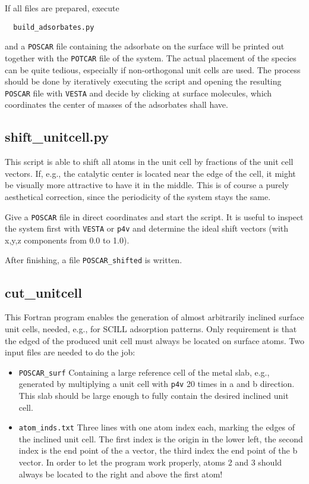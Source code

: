 \documentclass[a4paper,11pt]{article}
\begin{document}
 If all files are prepared, execute

 \begin{verbatim}
  build_adsorbates.py
 \end{verbatim}

 and a \texttt{POSCAR} file containing the adsorbate on the surface will be printed out
 together with the \texttt{POTCAR} file of the system.
 The actual placement of the species can be quite tedious, especially if non-orthogonal
 unit cells are used. The process should be done by iteratively executing the script
 and opening the resulting \texttt{POSCAR} file with \texttt{VESTA} and decide by clicking
 at surface molecules, which coordinates the center of masses of the adsorbates shall have.




\subsection{shift\_unitcell.py}\label{shift_unitcell}

This script is able to shift all atoms in the unit cell by fractions of the 
unit cell vectors. If, e.g., the catalytic center is located near the edge of the 
cell, it might be visually more attractive to have it in the middle.
This is of course a purely aesthetical correction, since the periodicity of the 
system stays the same.

Give a \texttt{POSCAR} file in direct coordinates and start the script.
It is useful to inspect the system first with \texttt{VESTA} or \texttt{p4v} 
and determine the ideal shift vectors (with x,y,z components from 0.0 to 1.0).

After finishing, a file \texttt{POSCAR\_shifted} is written.

\subsection{cut\_unitcell}\label{cut_unitcell}

This Fortran program enables the generation of almost arbitrarily inclined surface 
unit cells, needed, e.g., for SCILL adsorption patterns.
Only requirement is that the edged of the produced unit cell must always be located on 
surface atoms.
Two input files are needed to do the job:

\begin{itemize}
 \item \texttt{POSCAR\_surf} Containing a large reference cell of the metal slab, e.g., generated by 
 multiplying a unit cell with \texttt{p4v} 20 times in a and b direction. This slab should 
 be large enough to fully contain the desired inclined unit cell.
 \item \texttt{atom\_inds.txt} Three lines with one atom index each, marking the edges of the 
 inclined unit cell. The first index is the origin in the lower left, the second index is the 
 end point of the a vector, the third index the end point of the b vector.
In order to let the program work properly, atoms 2 and 3 should always be located to the right and above 
the first atom!
\end{itemize}
\end{document}
